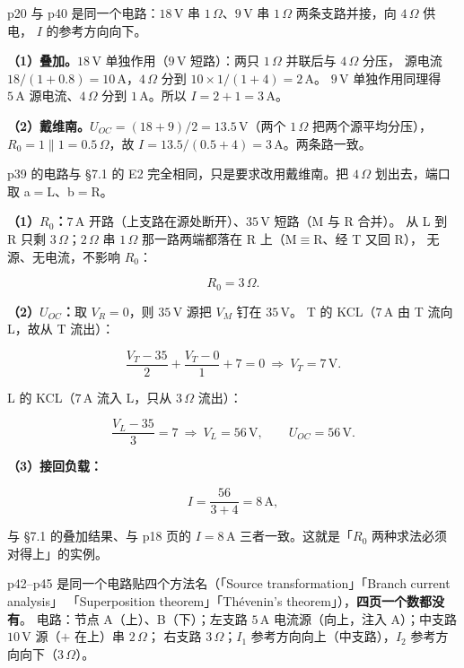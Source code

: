 \documentclass[11pt]{ctexart}
\begin{document}
p20 与 p40 是同一个电路：$18\,\mathrm{V}$ 串 $1\,\Omega$、$9\,\mathrm{V}$ 串 $1\,\Omega$ 两条支路并接，向 $4\,\Omega$ 供电，
$I$ 的参考方向向下。

\textbf{（1）叠加。}$18\,\mathrm{V}$ 单独作用（$9\,\mathrm{V}$ 短路）：两只 $1\,\Omega$ 并联后与 $4\,\Omega$ 分压，
源电流 $18/(1+0.8)=10\,\mathrm{A}$，$4\,\Omega$ 分到 $10\times1/(1+4)=2\,\mathrm{A}$。
$9\,\mathrm{V}$ 单独作用同理得 $5\,\mathrm{A}$ 源电流、$4\,\Omega$ 分到 $1\,\mathrm{A}$。所以 $I=2+1=3\,\mathrm{A}$。

\textbf{（2）戴维南。}$U_{OC}=(18+9)/2=13.5\,\mathrm{V}$（两个 $1\,\Omega$ 把两个源平均分压），
$R_0=1\parallel1=0.5\,\Omega$，故 $I=13.5/(0.5+4)=3\,\mathrm{A}$。两条路一致。


p39 的电路与 §7.1 的 E2 完全相同，只是要求改用戴维南。把 $4\,\Omega$ 划出去，端口取 a$=$L、b$=$R。

\textbf{（1）$R_0$：}$7\,\mathrm{A}$ 开路（上支路在源处断开）、$35\,\mathrm{V}$ 短路（M 与 R 合并）。
从 L 到 R 只剩 $3\,\Omega$；$2\,\Omega$ 串 $1\,\Omega$ 那一路两端都落在 R 上（M$\equiv$R、经 T 又回 R），
无源、无电流，不影响 $R_0$：

\[ R_0=3\,\Omega . \]


\textbf{（2）$U_{OC}$：}取 $V_R=0$，则 $35\,\mathrm{V}$ 源把 $V_M$ 钉在 $35\,\mathrm{V}$。
T 的 KCL（$7\,\mathrm{A}$ 由 T 流向 L，故从 T 流出）：

\[ \frac{V_T-35}{2}+\frac{V_T-0}{1}+7=0\ \Longrightarrow\ V_T=7\,\mathrm{V} . \]

L 的 KCL（$7\,\mathrm{A}$ 流入 L，只从 $3\,\Omega$ 流出）：

\[ \frac{V_L-35}{3}=7\ \Longrightarrow\ V_L=56\,\mathrm{V},\qquad U_{OC}=56\,\mathrm{V} . \]

\textbf{（3）接回负载：}

\[ I=\frac{56}{3+4}=8\,\mathrm{A} , \]

与 §7.1 的叠加结果、与 p18 页的 $I=8\,\mathrm{A}$ 三者一致。这就是「$R_0$ 两种求法必须对得上」的实例。


p42--p45 是同一个电路贴四个方法名（「Source transformation」「Branch current analysis」
「Superposition theorem」「Thévenin's theorem」），\textbf{四页一个数都没有}。
电路：节点 A（上）、B（下）；左支路 $5\,\mathrm{A}$ 电流源（向上，注入 A）；中支路 $10\,\mathrm{V}$ 源（$+$ 在上）串 $2\,\Omega$；
右支路 $3\,\Omega$；$I_1$ 参考方向向上（中支路），$I_2$ 参考方向向下（$3\,\Omega$）。
\end{document}
